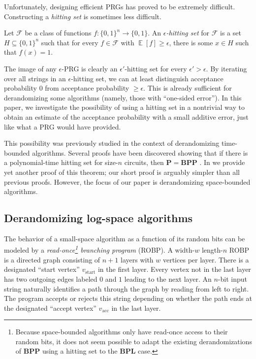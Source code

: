 \documentclass{toc}
\DeclareMathOperator*{\ExpVal}{\mathbb{E}}
\begin{document}
Unfortunately, designing efficient PRGs has proved to be extremely difficult. Constructing a \emph{hitting set} is sometimes less difficult.
\begin{definition}
Let $\mathcal{F}$ be a class of functions $f \colon \{0, 1\}^n \to \{0, 1\}$. An \emph{$\epsilon$-hitting set} for $\mathcal{F}$ is a set $H \subseteq \{0, 1\}^n$ such that for every $f \in \mathcal{F}$ with $\ExpVal[f] \geq \epsilon$, there is some $x \in H$ such that $f(x) = 1$.
\end{definition}
The image of any $\epsilon$-PRG is clearly an $\epsilon'$-hitting set for every $\epsilon' > \epsilon$. By iterating over all strings in an $\epsilon$-hitting set, we can at least distinguish acceptance probability $0$ from acceptance probability $\geq \epsilon$. This is already sufficient for derandomizing some algorithms (namely, those with ``one-sided error''). In this paper, we investigate the possibility of using a hitting set in a nontrivial way to obtain an estimate of the acceptance probability with a small additive error, just like what a PRG would have provided.

This possibility was previously studied in the context of derandomizing time-bounded algorithms. Several proofs have been discovered showing that if there is a polynomial-time hitting set for size-$n$ circuits, then $\mathbf{P} = \mathbf{BPP}$ \cite{ACR98,BF99,ACRT99,GVW11}. In  we provide yet another proof of this theorem; our short proof is arguably simpler than all previous proofs. However, the focus of our paper is derandomizing space-bounded algorithms.

\subsection{Derandomizing log-space algorithms}

The behavior of a small-space algorithm as a function of its random bits can be modeled by a \emph{read-once\footnote{Because space-bounded algorithms only have read-once access to their random bits, it does not seem possible to adapt the existing derandomizations of $\mathbf{BPP}$ using a hitting set to the $\mathbf{BPL}$ case.} branching program} (ROBP). A width-$w$ length-$n$ ROBP is a directed graph consisting of $n + 1$ layers with $w$ vertices per layer. There is a designated ``start vertex'' $v_{\text{start}}$ in the first layer. Every vertex not in the last layer has two outgoing edges labeled $0$ and $1$ leading to the next layer. An $n$-bit input string naturally identifies a path through the graph by reading from left to right. The program accepts or rejects this string depending on whether the path ends at the designated ``accept vertex'' $v_{\text{acc}}$ in the last layer.
\end{document}
